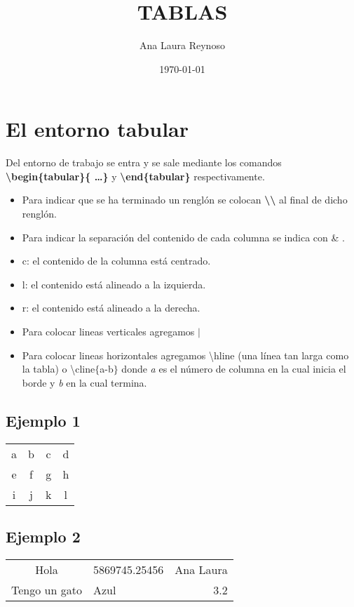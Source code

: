 \documentclass{article}
\title{TABLAS}
\author{Ana Laura Reynoso }
\date{\today} %
\begin{document}
\maketitle %

\section{El entorno tabular}
Del entorno de trabajo se entra y se sale mediante los comandos \textbf{\textbackslash begin\{tabular\}\{ \dots \}}  y \textbf{\textbackslash end\{tabular\}} respectivamente. 

\begin{itemize}
	\item Para indicar que se ha terminado un renglón se colocan \textbf{\textbackslash 						\textbackslash} al final de dicho renglón.
	\item Para indicar la separación del contenido de cada columna se indica con \& .
	\item c: el contenido de la columna está centrado.
	\item l: el contenido está alineado a la izquierda.
	\item r: el contenido está alineado a la derecha.
	\item Para colocar lineas verticales agregamos $\mid$ 
	\item Para colocar lineas horizontales agregamos \textbackslash hline (una línea tan larga 					como la tabla) o \textbackslash cline$\lbrace$a-b$\rbrace$ donde \textit{a} es el número de columna en la cual inicia el borde y \textit{b} en la cual termina.
	
\end{itemize}

\subsection{Ejemplo 1}
\begin{tabular}{c c c c}
	a & b & c & d \\
	e & f & g & h \\
	i & j & k & l
\end{tabular}

\subsection{Ejemplo 2}
\begin{tabular}{c l r}
	Hola 		  & 5869745.25456 & Ana Laura \\
	Tengo un gato & Azul 		  & 3.2       \\
\end{tabular}
\end{document}
